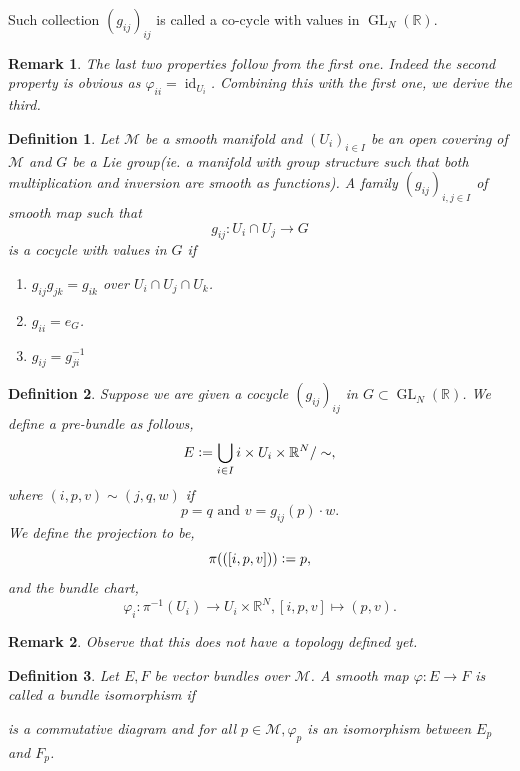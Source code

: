 \documentclass[10pt]{article}
\newtheorem{definition}{Definition}[section]
\newtheorem{remark}{Remark}[section]
\DeclareMathOperator{\GL}{GL}
\DeclareMathOperator{\id}{id}
\newcommand{\defeq}{\vcentcolon=}
\newcommand{\R}[0]{\mathbb{R}}
\newcommand{\M}[0]{\mathcal{M}}
\begin{document}
  Such collection $(g_{ij})_{ij}$ is called a co-cycle with values in $\GL_N(\R)$.
  \begin{remark}
    The last two properties follow from the first one. Indeed the second property is obvious as $\varphi_{ii} = \id_{U_i}$. Combining this with the first one, we derive the third.
  \end{remark}
  \begin{definition}
    Let $\M$ be a smooth manifold and $(U_i)_{i\in I}$ be an open covering of $\M$ and $G$ be a Lie group(ie. a manifold with group structure such that both multiplication and inversion are smooth as functions). A family $(g_{ij})_{i,j\in I}$ of smooth map such that 
    \begin{equation*}
      g_{ij}:U_i\cap U_j\to G
    \end{equation*}
    is a cocycle with values in $G$ if 
    \begin{enumerate}
      \item $g_{ij}g_{jk} = g_{ik}$ over $U_i\cap U_j\cap U_k$.
      \item $g_{ii} = e_G$.
      \item $g_{ij} = g_{ji}^{-1}$
    \end{enumerate}
  \end{definition}
  \begin{definition}
  Suppose we are given a cocycle $(g_{ij})_{ij}$ in $G\subset\GL_N(\R)$. We define a pre-bundle as follows,
  \begin{equation*}
    E \defeq \bigcup_{i\in I}{i}\times U_i\times \R^N/\sim,
  \end{equation*}
  where $(i,p,v)\sim(j,q,w)$ if 
  \begin{equation*}
    p=q\text{ and } v = g_{ij}(p)\cdot w.
  \end{equation*}
  We define the projection to be,
  \begin{equation*}
    \pi(([i,p,v]))\defeq p,
  \end{equation*}
  and the bundle chart,
  \begin{equation*}  
    \varphi_i:\pi^{-1}(U_i)\to U_i\times\R^N,[i,p,v]\mapsto (p,v).
  \end{equation*}
  \end{definition}
  \begin{remark}
    Observe that this does not have a topology defined yet.
  \end{remark}
  \begin{definition}
    Let $E,F$ be vector bundles over $\M$. A smooth map $\varphi:E\to F$ is called a bundle isomorphism if
    \begin{center}
    \end{center}
    is a commutative diagram and for all $p\in\M,\varphi_p$ is an isomorphism between $E_p$ and $F_p$.
  \end{definition}
\end{document}
